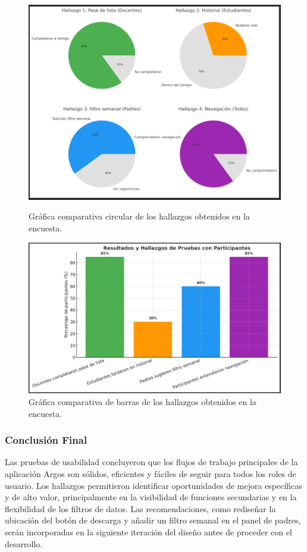 \begin{figure}[H]
    \centering
    \begin{minipage}[b]{0.65\textwidth}
        \centering
        \includegraphics[width=1.0\textwidth]{./Media/Circulo.png}
        \caption{Gráfica comparativa circular de los hallazgos obtenidos en la encuesta.}
    \end{minipage}

     \centering
    \begin{minipage}[b]{0.65\textwidth}
        \centering
        \includegraphics[width=1.0\textwidth]{./Media/Barras.png}
        \caption{Gráfica comparativa de barras de los hallazgos obtenidos en la encuesta.}
    \end{minipage}
\end{figure}


\subsubsection{Conclusión Final}
Las pruebas de usabilidad concluyeron que los flujos de trabajo principales de la aplicación Argos son sólidos, eficientes y fáciles de seguir para todos los roles de usuario. Los hallazgos permitieron identificar oportunidades de mejora específicas y de alto valor, principalmente en la visibilidad de funciones secundarias y en la flexibilidad de los filtros de datos. Las recomendaciones, como rediseñar la ubicación del botón de descarga y añadir un filtro semanal en el panel de padres, serán incorporadas en la siguiente iteración del diseño antes de proceder con el desarrollo.